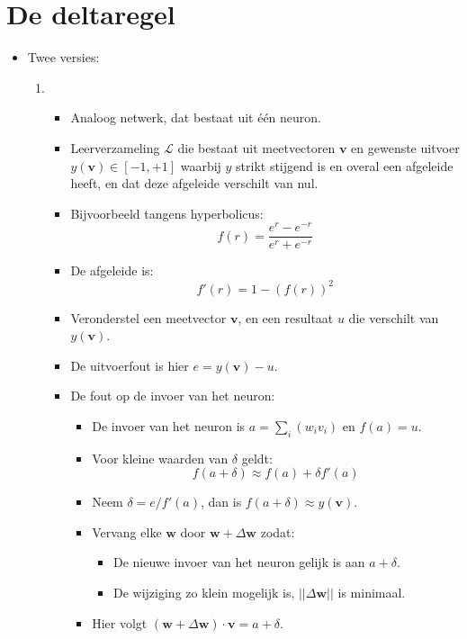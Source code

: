 \section{De deltaregel}
\begin{itemize}
    \item Twee versies:
    \begin{enumerate}
        \item \begin{itemize}
            \item Analoog netwerk, dat bestaat uit één neuron.
            \item Leerverzameling $\mathcal{L}$ die bestaat uit meetvectoren $\textbf{v}$ en gewenste uitvoer $y(\textbf{v}) \in [-1, +1]$ waarbij $y$ strikt stijgend is en overal een afgeleide heeft, en dat deze afgeleide verschilt van nul.
            \item Bijvoorbeeld tangens hyperbolicus:
            $$f(r) = \frac{e^{r} - e^{-r}}{e^r + e^{-r}}$$
            \item De afgeleide is:
            $$f'(r) = 1 - (f(r))^2$$
            \item Veronderstel een meetvector $\textbf{v}$, en een resultaat $u$ die verschilt van $y(\textbf{v})$.
            \item De uitvoerfout is hier $e = y(\textbf{v}) - u$.
            \item De fout op de invoer van het neuron:
            \begin{itemize}
                \item De invoer van het neuron is $a = \sum_i(w_iv_i)$ en $f(a) = u$.
                \item Voor kleine waarden van $\delta$ geldt:
                $$f(a + \delta) \approx f(a) + \delta f'(a)$$
                \item Neem $\delta = e/f'(a)$, dan is $f(a + \delta) \approx y(\textbf{v})$.
                \item Vervang elke $\textbf{w}$ door $\textbf{w} + \Delta \textbf{w}$ zodat:
                \begin{itemize}
                    \item De nieuwe invoer van het neuron gelijk is aan $a + \delta$.
                    \item De wijziging zo klein mogelijk is, $||\Delta \textbf{w}||$ is minimaal.
                \end{itemize}
                \item Hier volgt $(\textbf{w} + \Delta \textbf{w}) \cdot \textbf{v} = a + \delta$.

\end{itemize}
\end{itemize}
\end{enumerate}
\end{itemize}
